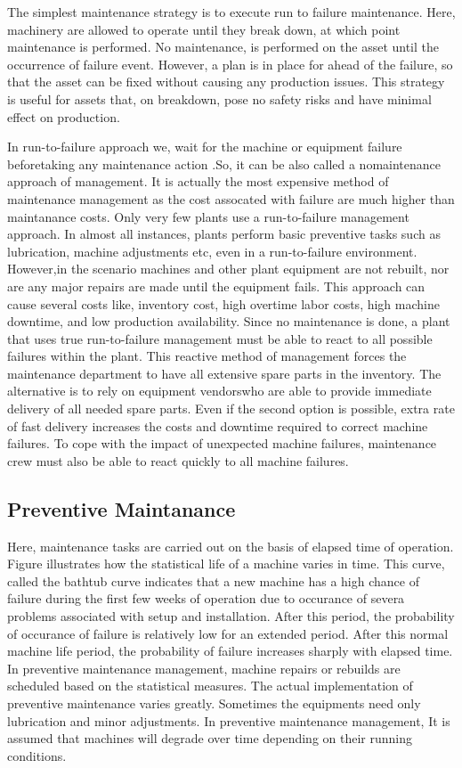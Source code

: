 The simplest maintenance strategy is to execute run to failure maintenance. Here, machinery are allowed to operate until they break down, at which point maintenance is performed. No maintenance, is performed on the asset until the occurrence of failure event. However, a plan is in place for ahead of the failure, so that the asset can be fixed without causing any production issues.  This strategy is useful for assets that, on breakdown, pose no safety risks and have minimal effect on production.

In run-to-failure approach we, wait for the machine or equipment
failure beforetaking any maintenance action .So, it can be also called a nomaintenance
approach of management. It is actually the most expensive method of
maintenance management as the cost assocated with failure are much higher than maintanance costs. Only very few plants use a run-to-failure management approach.
In almost all instances, plants perform basic preventive tasks such as lubrication,
machine adjustments etc, even in a run-to-failure environment.
However,in the scenario machines and other plant equipment are not
rebuilt, nor are any major repairs are made until the equipment fails. This approach can cause several costs like,
inventory cost, high overtime labor costs, high machine downtime, and low production
availability.
Since no  maintenance is done, a plant that uses
true run-to-failure management must be able to react to all possible failures within the
plant. This reactive method of management forces the maintenance department to
have all extensive spare parts in the inventory. The alternative is to rely on
equipment vendorswho are able to provide immediate delivery of all needed spare parts.
Even if the second option is possible, extra rate of fast delivery 
increases the costs  and downtime required to correct machine failures.
To cope with the impact of  unexpected machine failures, maintenance
crew must also be able to react quickly to all machine failures. 

\subsection{Preventive Maintanance}

Here, maintenance tasks are carried out on the basis of
elapsed time  of operation. Figure illustrates how the statistical
life of a machine varies in time. This curve, called the bathtub curve
indicates that a new machine has a high chance of failure during the first few weeks of operation due to occurance of severa problems associated with setup and installation. After this  period, the probability
of occurance of failure is relatively low for an extended period. After this normal machine
life period, the probability of failure increases sharply with elapsed time. In preventive
maintenance management, machine repairs or rebuilds are scheduled based on the
statistical measures.
The actual implementation of preventive maintenance varies greatly. Sometimes the equipments need only lubrication and minor adjustments.
In preventive maintenance management, It is  assumed that machines will degrade
over time depending on their running conditions.

